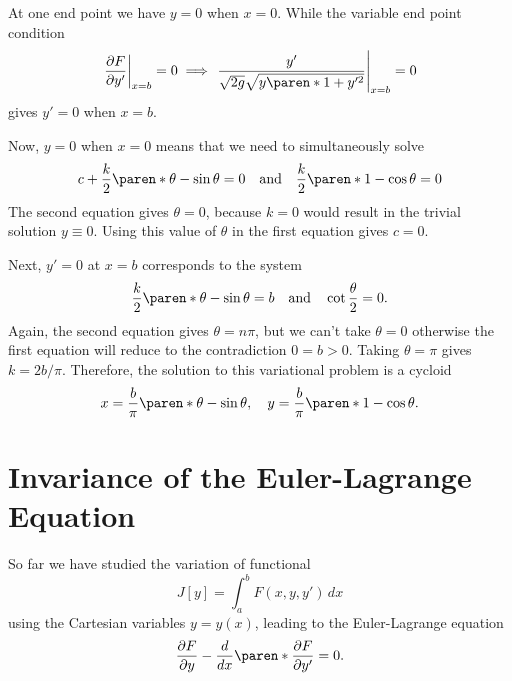 \documentclass[11pt]{penrose}
\begin{document}
\begin{negg}
    At one end point we have $y = 0$ when $x = 0$. While the variable end point condition
    \begin{equation}
        \left. \frac{\pd F}{\pd y'} \right|_{x=b} = 0
        \implies
        \left. \frac{y'}{ \sqrt{2g} \sqrt{y \paren*{1 + y'^2}}} \right|_{x=b} = 0
    \end{equation}
    gives $y' = 0$ when $x = b$.

    Now, $y = 0$ when $x = 0$ means that we need to simultaneously solve
    \begin{equation}
        c + \frac{k}{2} \paren*{\theta - \sin\theta} = 0
        \quad\text{and}\quad
        \frac{k}{2} \paren*{1 - \cos\theta} = 0
    \end{equation}
    The second equation gives $\theta = 0$, because $k = 0$ would result in the trivial solution $y \equiv 0$. Using this value of $\theta$ in the first equation gives $c = 0$.

    Next, $y' = 0$ at $x = b$ corresponds to the system
    \begin{equation}
        \frac{k}{2} \paren*{\theta - \sin\theta} = b
        \quad\text{and}\quad
        \cot \frac{\theta}{2} = 0.
    \end{equation}
    Again, the second equation gives $\theta = n\pi$, but we can't take $\theta = 0$ otherwise the first equation will reduce to the contradiction $0 = b > 0$. Taking $\theta = \pi$ gives $k = 2b/\pi$. Therefore, the solution to this variational problem is a cycloid
    \begin{equation}
        x = \frac{b}{\pi} \paren*{\theta - \sin\theta},
        \quad
        y = \frac{b}{\pi} \paren*{1 - \cos\theta}.
    \end{equation}
\end{negg}

\section{Invariance of the Euler-Lagrange Equation}
So far we have studied the variation of functional
\begin{equation}
    J[y] = \int_a^b F(x, y, y') \,dx
\end{equation}
using the Cartesian variables $y = y(x)$, leading to the Euler-Lagrange equation
\begin{equation}
    \frac{\pd F}{\pd y} - \frac{d}{dx}\paren*{\frac{\pd F}{\pd y'}} = 0.
\end{equation}
\end{document}
